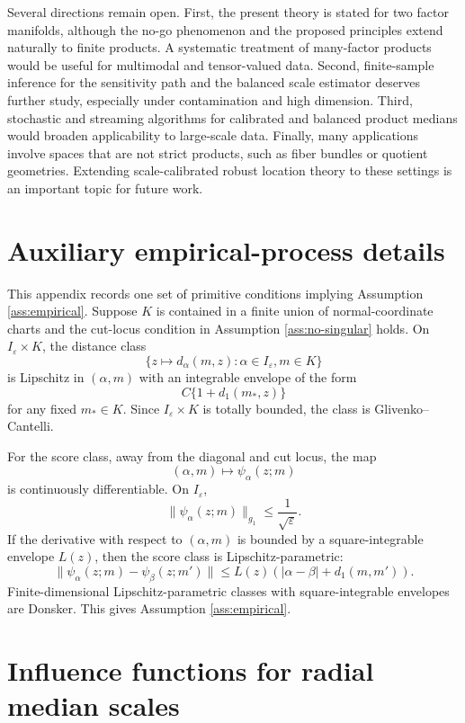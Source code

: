 \documentclass[11pt]{article}
\newcommand{\eps}{\varepsilon}
\newcommand{\1}{\mathbf{1}}
\begin{document}
Several directions remain open.  First, the present theory is stated for two
factor manifolds, although the no-go phenomenon and the proposed principles
extend naturally to finite products.  A systematic treatment of many-factor
products would be useful for multimodal and tensor-valued data.  Second,
finite-sample inference for the sensitivity path and the balanced scale
estimator deserves further study, especially under contamination and high
dimension.  Third, stochastic and streaming algorithms for calibrated and
balanced product medians would broaden applicability to large-scale data.
Finally, many applications involve spaces that are not strict products, such as
fiber bundles or quotient geometries.  Extending scale-calibrated robust
location theory to these settings is an important topic for future work.



\appendix
\section{Auxiliary empirical-process details}\label{app:auxiliary}

This appendix records one set of primitive conditions implying Assumption \ref{ass:empirical}.  Suppose $K$ is contained in a finite union of normal-coordinate charts and the cut-locus condition in Assumption \ref{ass:no-singular} holds.  On $I_\eps\times K$, the distance class
\[
 \{z\mapsto d_\alpha(m,z):\alpha\in I_\eps,m\in K\}
\]
is Lipschitz in $(\alpha,m)$ with an integrable envelope of the form
\[
 C\{1+d_1(m_*,z)\}
\]
for any fixed $m_*\in K$.  Since $I_\eps\times K$ is totally bounded, the class is Glivenko--Cantelli.

For the score class, away from the diagonal and cut locus, the map
\[
 (\alpha,m)\mapsto \psi_\alpha(z;m)
\]
is continuously differentiable.  On $I_\eps$,
\[
 \|\psi_\alpha(z;m)\|_{g_1}
 \le \frac1{\sqrt\eps}.
\]
If the derivative with respect to $(\alpha,m)$ is bounded by a square-integrable envelope $L(z)$, then the score class is Lipschitz-parametric:
\[
 \|\psi_\alpha(z;m)-\psi_\beta(z;m')\|
 \le L(z)(|\alpha-\beta|+d_1(m,m')).
\]
Finite-dimensional Lipschitz-parametric classes with square-integrable envelopes are Donsker.  This gives Assumption \ref{ass:empirical}.

\section{Influence functions for radial median scales}\label{app:scale-if}
\end{document}
